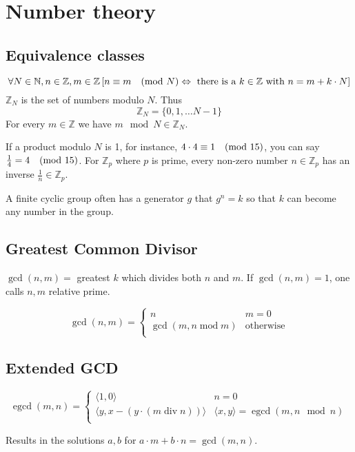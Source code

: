 \documentclass{article}
\newcommand{\wmod}[1]{\text{\quad (mod }#1\text{)}}
\newcommand{\Z}{\mathbb{Z}}
\newcommand{\N}{\mathbb{N}}
\newcommand{\egcd}{\operatorname{egcd}}
\begin{document}
\section{Number theory}

\subsection{Equivalence classes}

\[ \forall N \in \N, n \in \Z, m \in \Z 
  \,[n \equiv m \wmod{N} \Leftrightarrow 
      \text{ there is a } k \in \Z \text { with } n = m + k \cdot N]
\]
$\Z_N$ is the set of numbers modulo $N$. Thus 
\[ \Z_N = \{ 0, 1, \dots N-1\} \]
For every $m \in \Z$ we have $m \mod N \in \Z_N$.

If a product modulo $N$ is 1, for instance, $4 \cdot 4 \equiv 1 \wmod{15}$, you
can say $\frac{1}{4}=4 \wmod{15}$. For $\Z_p$ where $p$ is prime, every
non-zero number $n \in \Z_p$ has an inverse $\frac{1}{n} \in \Z_p$.

A finite cyclic group often has a generator $g$ that $g^n = k$ so that $k$ can become
any number in the group.

\subsection{Greatest Common Divisor}

$\gcd(n,m) = $ greatest $k$ which divides both $n$ and $m$. If $\gcd(n,m) = 1$, one
calls $n,m$ relative prime.

\[ 
  \gcd (n,m) = \begin{cases}
    n & m=0 \\
    \gcd(m, n \operatorname{mod} m) & \text{otherwise}\\
  \end{cases}
\]

\subsection{Extended GCD}

\[
  \egcd(m,n) = \begin{cases}
    \langle 1,0 \rangle & n = 0 \\
    \langle y, x - (y \cdot (m \operatorname{div} n))\rangle & \langle x, y \rangle = \egcd(m, n \mod n) \\
  \end{cases}
\]

Results in the solutions $a,b$ for $a \cdot m + b \cdot n = \gcd(m,n)$.
\end{document}
